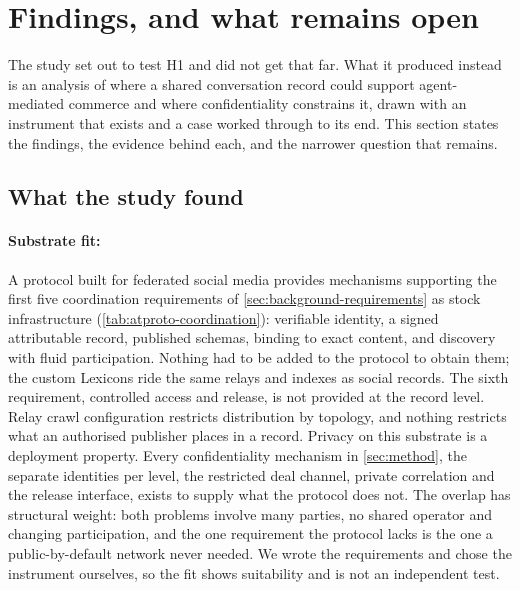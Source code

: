 \section{Findings, and what remains open}
\label{sec:research-agenda}
\label{sec:findings}

The study set out to test H1 and did not get that far. What it produced instead is an analysis of where a shared conversation record could support agent-mediated commerce and where confidentiality constrains it, drawn with an instrument that exists and a case worked through to its end. This section states the findings, the evidence behind each, and the narrower question that remains.

\subsection{What the study found}

\paragraph{Substrate fit:} A protocol built for federated social media provides mechanisms supporting the first five coordination requirements of \cref{sec:background-requirements} as stock infrastructure (\cref{tab:atproto-coordination}): verifiable identity, a signed attributable record, published schemas, binding to exact content, and discovery with fluid participation. Nothing had to be added to the protocol to obtain them; the custom Lexicons ride the same relays and indexes as social records. The sixth requirement, controlled access and release, is not provided at the record level. Relay crawl configuration restricts distribution by topology, and nothing restricts what an authorised publisher places in a record. Privacy on this substrate is a deployment property. Every confidentiality mechanism in \cref{sec:method}, the separate identities per level, the restricted deal channel, private correlation and the release interface, exists to supply what the protocol does not. The overlap has structural weight: both problems involve many parties, no shared operator and changing participation, and the one requirement the protocol lacks is the one a public-by-default network never needed. We wrote the requirements and chose the instrument ourselves, so the fit shows suitability and is not an independent test.

